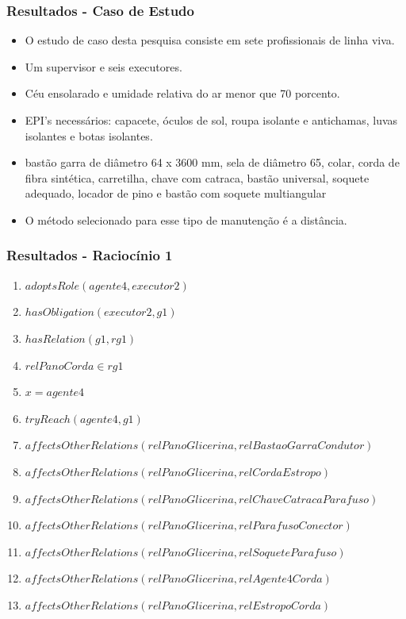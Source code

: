 \documentclass{beamer}
\begin{document}
\begin{frame}
	\frametitle{Resultados - Caso de Estudo}
	\begin{itemize}
		\item O estudo de caso desta pesquisa consiste em sete profissionais de linha viva.
		\item Um supervisor e seis executores.
		\item Céu ensolarado e umidade relativa do ar menor que 70 porcento.
		\item EPI's necessários: capacete, óculos de sol, roupa isolante e antichamas, luvas isolantes e botas isolantes.
		\item  bastão garra de diâmetro 64 x 3600 mm, sela de diâmetro 65, colar, corda de fibra sintética, carretilha, chave com catraca, bastão universal, soquete adequado, locador de pino e bastão com soquete multiangular
		\item O método selecionado para esse tipo de manutenção é a distância.
	\end{itemize}
\end{frame}
\begin{frame}
	\frametitle{Resultados - Raciocínio 1}
	\begin{enumerate}
		\item $adoptsRole(agente4,executor2)$ 
		\item $hasObligation(executor2,g1)$
		\item $hasRelation(g1,rg1)$ 
		\item $relPanoCorda \in rg1$
		\item $ x = agente4 $
		\item $tryReach(agente4,g1)$
		\item $affectsOtherRelations(relPanoGlicerina,relBastaoGarraCondutor)$
		\item $affectsOtherRelations(relPanoGlicerina,relCordaEstropo)$  
		\item $affectsOtherRelations(relPanoGlicerina,relChaveCatracaParafuso)$
		\item $affectsOtherRelations(relPanoGlicerina,relParafusoConector)$ 
		\item $affectsOtherRelations(relPanoGlicerina,relSoqueteParafuso)$ 
		\item $affectsOtherRelations(relPanoGlicerina,relAgente4Corda)$ 
		\item $affectsOtherRelations(relPanoGlicerina,relEstropoCorda)$	
	\end{enumerate}
\end{frame}
\end{document}
